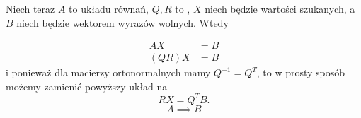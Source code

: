 \documentclass{article}
\begin{document}
\begin{important}
Niech teraz $A$ to  układu równań, $Q,R$ to , $X$ niech będzie  wartości szukanych, a $B$ niech będzie wektorem wyrazów wolnych. Wtedy
\end{important}

\begin{align*}
    AX&=B\\
    (QR)X&=B
\end{align*}
i ponieważ dla macierzy ortonormalnych mamy $Q^{-1}=Q^T$, to w prosty sposób możemy zamienić powyższy układ na
$$RX=Q^TB.$$
$$A\implies B$$

\proofend
\end{document}
